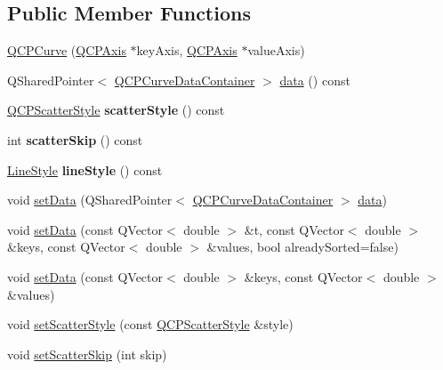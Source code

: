 \subsection*{Public Member Functions}
\begin{DoxyCompactItemize}
\item 
\hyperlink{class_q_c_p_curve_a36de58e2652b3fa47bdf9187d421d3ce}{Q\+C\+P\+Curve} (\hyperlink{class_q_c_p_axis}{Q\+C\+P\+Axis} $\ast$key\+Axis, \hyperlink{class_q_c_p_axis}{Q\+C\+P\+Axis} $\ast$value\+Axis)
\item 
Q\+Shared\+Pointer$<$ \hyperlink{class_q_c_p_data_container}{Q\+C\+P\+Curve\+Data\+Container} $>$ \hyperlink{class_q_c_p_curve_a761492fd00b1ab7cb18ce23c118c6c60}{data} () const
\item 
\mbox{\label{class_q_c_p_curve_afa6bd72a3a331a5ed45d3e0c5843b592}} 
\hyperlink{class_q_c_p_scatter_style}{Q\+C\+P\+Scatter\+Style} {\bfseries scatter\+Style} () const
\item 
\mbox{\label{class_q_c_p_curve_a09b33217172aedf6c62c441b4ff66166}} 
int {\bfseries scatter\+Skip} () const
\item 
\mbox{\label{class_q_c_p_curve_a06e3cf3f8f1add689254b3cda66e040e}} 
\hyperlink{class_q_c_p_curve_a2710e9f79302152cff794c6e16cc01f1}{Line\+Style} {\bfseries line\+Style} () const
\item 
void \hyperlink{class_q_c_p_curve_a41246850d2e080bc57183ca19cd4135e}{set\+Data} (Q\+Shared\+Pointer$<$ \hyperlink{class_q_c_p_data_container}{Q\+C\+P\+Curve\+Data\+Container} $>$ \hyperlink{class_q_c_p_curve_a761492fd00b1ab7cb18ce23c118c6c60}{data})
\item 
void \hyperlink{class_q_c_p_curve_a0768af2c33c8dcffa3cf5bdeb53923a6}{set\+Data} (const Q\+Vector$<$ double $>$ \&t, const Q\+Vector$<$ double $>$ \&keys, const Q\+Vector$<$ double $>$ \&values, bool already\+Sorted=false)
\item 
void \hyperlink{class_q_c_p_curve_a9d3245d43304226e013240c94802f7f6}{set\+Data} (const Q\+Vector$<$ double $>$ \&keys, const Q\+Vector$<$ double $>$ \&values)
\item 
void \hyperlink{class_q_c_p_curve_a55e43b44709bf50a35500644988aa706}{set\+Scatter\+Style} (const \hyperlink{class_q_c_p_scatter_style}{Q\+C\+P\+Scatter\+Style} \&style)
\item 
void \hyperlink{class_q_c_p_curve_a97dbfecd497e972d5f2162615e6da5be}{set\+Scatter\+Skip} (int skip)

\end{DoxyCompactItemize}
